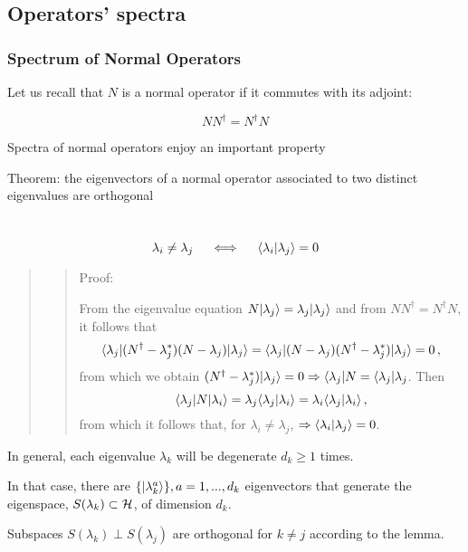 \documentclass[11pt]{article}
\begin{document}
    \subsection{Operators' spectra}\label{operators-spectra}

    \subsubsection{Spectrum of Normal
Operators}\label{spectrum-of-normal-operators}

    Let us recall that \(N\) is a normal operator if it commutes with its
adjoint:

\[
NN^\dagger = N^\dagger N
\]

Spectra of normal operators enjoy an important property

    Theorem: the eigenvectors of a normal operator associated to two
distinct eigenvalues are orthogonal \\
\strut \\
\[
\lambda_i\neq \lambda_j~~~~\Longleftrightarrow ~~~~ \langle \lambda_i|\lambda_j\rangle = 0
\]

\begin{quote}
\begin{quote}
Proof:

From the eigenvalue equation
\(N|\lambda_j\rangle =  \lambda_j |\lambda_j\rangle\) and from
\(NN^\dagger = N^\dagger N\), it follows that \[
\langle \lambda_j|(N^\dagger - \lambda_j^*)(N - \lambda_j) |\lambda_j\rangle = \langle \lambda_j|(N - \lambda_j)(N^\dagger - \lambda_j^*) |\lambda_j\rangle  = 0\,,
\] from which we obtain
\((N^\dagger - \lambda_j^*) |\lambda_j\rangle = 0 \Rightarrow \langle \lambda_j| N = \langle \lambda_j|\lambda_j\).
Then \[
\langle \lambda_j|N|\lambda_i\rangle = \lambda_j \langle \lambda_j|\lambda_i\rangle = \lambda_i \langle \lambda_j|\lambda_i\rangle \, ,
\] from which it follows that, for \(\lambda_i \neq \lambda_j\),
\(\Rightarrow \langle \lambda_i|\lambda_j\rangle = 0\).
\end{quote}
\end{quote}

    In general, each eigenvalue \(\lambda_k\) will be degenerate
\(d_k \geq 1\) times.

In that case, there are \(\{|\lambda^a_k\rangle\}, a=1,...,d_k\)
eigenvectors that generate the eigenspace,
\(S(\lambda_k) \subset {\cal H}\), of dimension \(d_k\).

    Subspaces \(S(\lambda_k) \perp S(\lambda_j)\) are orthogonal for
\(k \neq j\) according to the lemma.\\
\end{document}
